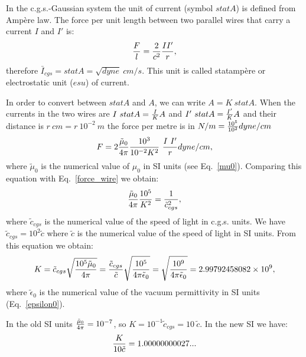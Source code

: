 \documentclass[12pt,a4paper]{article}
\def\kappa{2.99792458082\times 10^{9}}
\def\kappadiecic{1.00000000027}
\begin{document}
{\color{orange} In the c.g.s.-Gaussian system the unit of current 
(symbol $statA$) is defined from Amp\`ere law. The force per unit length 
between two parallel wires that carry a current $I$ and $I'$ is:
\begin{equation}
{F\over l} = {2\over c^2} {I I'\over r},
\label{force_wire}
\end{equation}
therefore $\bar I_{cgs}=statA=\sqrt{dyne}\ cm/s$. This unit is called 
statamp\`ere or 
electrostatic unit ($esu$) of current.

In order to convert between $statA$ and $A$, we can write $A= K\ statA$. 
When the currents in the two wires are $I\ statA={I\over K} A$ and 
$I'\ statA={I'\over K} A$ and their distance
is $r\ cm=r\ 10^{-2}\ m$ the force per metre is in $N/m=
{10^5\over 10^2} dyne/cm$
\begin{equation}
F=2{\tilde \mu_0\over 4\pi} {10^3\over 10^{-2} K^2}\ {I\ I' \over r} dyne/cm,
\end{equation}
where $\tilde \mu_0$ is the numerical value of $\mu_0$ in SI units
(see Eq.~\ref{mu0}). Comparing this equation with Eq.~\ref{force_wire} we
obtain:
\begin{equation}
{\tilde \mu_0 \over 4 \pi} {10^5\over K^2} = 
{1\over \tilde c_{cgs}^2}, 
\end{equation}
where $\tilde c_{cgs}$ is the numerical value of the speed of light in
c.g.s. units. We have $\tilde c_{cgs}=10^2 \tilde c$ where $\tilde c$ is
the numerical value of the speed of light in SI units. From this
equation we obtain:
\begin{equation}
K = \tilde c_{cgs} \sqrt {10^5 \tilde \mu_0 \over 4 \pi} =
{\tilde c_{cgs}\over \tilde c} 
\sqrt {10^5 \over 4 \pi \tilde \epsilon_0}=\sqrt {10^9 \over 4 \pi 
\tilde \epsilon_0}=\kappa,
\end{equation}
where $\tilde \epsilon_0$ is the numerical value of the vacuum permittivity
in SI units (Eq.~\ref{epsilon0}).

In the old SI units ${\tilde \mu_0 \over 4 \pi} = 10^{-7}$, so 
$K=10^{-1} \tilde c_{cgs}= 10\ \tilde c$.
In the new SI we have:
\begin{equation}
{K\over 10 \tilde c}= \kappadiecic...
\end{equation}
\\
}
\end{document}
